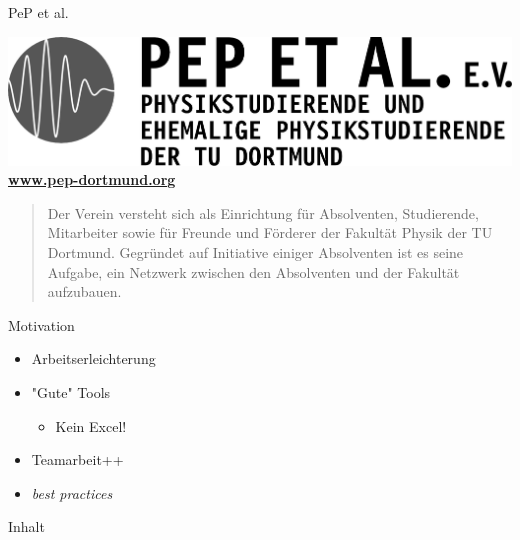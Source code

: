 {
  \begin{frame}
    \titlepage
  \end{frame}
}

\begin{frame}{PeP et al.}
  \begin{center}
    \includegraphics[width=.5\paperwidth]{img/peplogox.png} \\
    \color{TUgreen}\textbf{\href{http://pep-dortmund.org}{www.pep-dortmund.org}}
  \end{center}
  \begin{quote}
    \begin{spacing}{1.0}
      Der Verein versteht sich als Einrichtung für Absolventen, Studierende, Mitarbeiter sowie für Freunde und Förderer der Fakultät Physik der TU Dortmund. Gegründet auf Initiative einiger Absolventen ist es seine Aufgabe, ein Netzwerk zwischen den Absolventen und der Fakultät aufzubauen.
    \end{spacing}
  \end{quote}
\end{frame}

\begin{frame}{Motivation}
  \begin{itemize}
    \item Arbeitserleichterung
    \item "Gute" Tools \begin{itemize}
      \item Kein Excel!
    \end{itemize}
  \item Teamarbeit++
  \item \textit{best practices}
  \end{itemize}  
\end{frame}

\begin{frame}{Inhalt}
  \tableofcontents[subsectionstyle=hide]
\end{frame}

